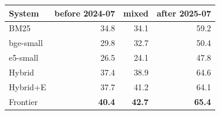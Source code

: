 \begin{tabular}{lrrr}
\toprule
System & before 2024-07 & mixed & after 2025-07 \\
\midrule
BM25 & 34.8 & 34.1 & 59.2 \\
bge-small & 29.8 & 32.7 & 50.4 \\
e5-small & 26.5 & 24.1 & 47.8 \\
Hybrid & 37.4 & 38.9 & 64.6 \\
Hybrid{+}E & 37.7 & 41.2 & 64.1 \\
Frontier & \textbf{40.4} & \textbf{42.7} & \textbf{65.4} \\
\bottomrule
\end{tabular}
